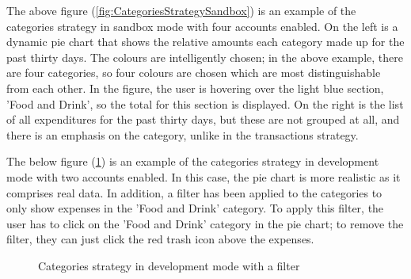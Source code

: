 The above figure (\ref{fig:CategoriesStrategySandbox}) is an example of the categories strategy in sandbox mode with four accounts enabled. On the left is a dynamic pie chart that shows the relative amounts each category made up for the past thirty days. The colours are intelligently chosen; in the above example, there are four categories, so four colours are chosen which are most distinguishable from each other. In the figure, the user is hovering over the light blue section, 'Food and Drink', so the total for this section is displayed. On the right is the list of all expenditures for the past thirty days, but these are not grouped at all, and there is an emphasis on the category, unlike in the transactions strategy.

The below figure (\ref{fig:CategoriesStrategyDevelopment}) is an example of the categories strategy in development mode with two accounts enabled. In this case, the pie chart is more realistic as it comprises real data. In addition, a filter has been applied to the categories to only show expenses in the 'Food and Drink' category. To apply this filter, the user has to click on the 'Food and Drink' category in the pie chart; to remove the filter, they can just click the red trash icon above the expenses.

\begin{figure}[H]
	\centering
	\caption{Categories strategy in development mode with a filter}
	\label{fig:CategoriesStrategyDevelopment}
\end{figure}

